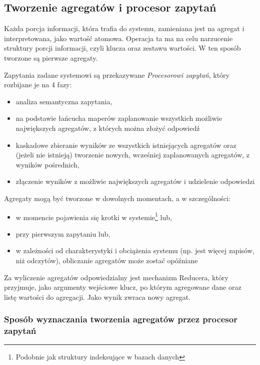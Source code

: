 \subsection{Tworzenie agregatów i procesor zapytań}

Każda porcja informacji, która trafia do systemu, zamieniana jest na agregat i interpretowana, jako wartość atomowa. Operacja ta ma na celu narzucenie struktury porcji informacji, czyli klucza oraz zestawu wartości. W ten sposób tworzone są pierwsze agregaty.

Zapytania zadane systemowi są przekazywane \emph{Procesorowi zapytań}, który rozbijane je na 4 fazy:

\begin{itemize}[noitemsep]
\item analiza semantyczna zapytania,
\item na podstawie łańcucha maperów zaplanowanie wszystkich możliwie największych agregatów, z których można złożyć odpowiedź
\item kaskadowe zbieranie wyników ze wszystkich istniejących agregatów oraz (jeżeli nie istnieją) tworzenie nowych, wcześniej zaplanowanych agregatów, z wyników pośrednich,
\item złączenie wyników z możliwie największych agregatów i udzielenie odpowiedzi
\end{itemize}

Agregaty mogą być tworzone w dowolnych momentach, a w szczególności:

\begin{itemize}[noitemsep]
\item w momencie pojawienia się krotki w systemie\footnote{Podobnie jak struktury indeksujące w bazach danych} lub,
\item przy pierwszym zapytaniu lub,
\item w zależności od charakterystyki i obciążenia systemu (np. jest więcej zapisów, niż odczytów), obliczanie agregatów może zostać opóźniane
\end{itemize}

Za wyliczenie agregatów odpowiedzialny jest mechanizm Reducera, który przyjmuje, jako argumenty wejściowe klucz, po którym agregowane dane oraz listę wartości do agregacji. Jako wynik zwraca nowy agregat.



\subsubsection{Sposób wyznaczania tworzenia agregatów przez procesor zapytań}

